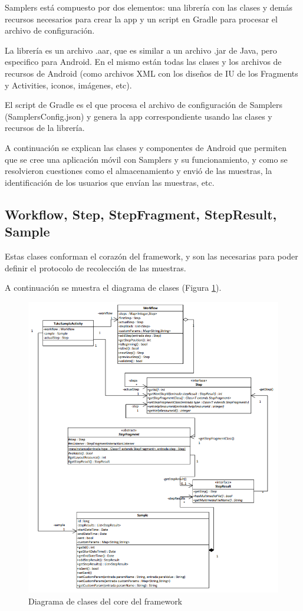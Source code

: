 Samplers está compuesto por dos elementos: una librería con las clases y demás recursos necesarios para crear la app y un script en Gradle para procesar el archivo de configuración.

La librería es un archivo .aar, que es similar a un archivo .jar de Java, pero especifico para Android. En el mismo están todas las clases y los archivos de recursos de Android (como archivos XML con los diseños de IU de los Fragments y Activities, iconos, imágenes, etc).

El script de Gradle es el que procesa el archivo de configuración de Samplers (SamplersConfig.json) y genera la app correspondiente usando las clases y recursos de la librería.

A continuación se explican las clases y componentes de Android que permiten que se cree una aplicación móvil con Samplers y su funcionamiento, y como se resolvieron cuestiones como el almacenamiento y envió de las muestras, la identificación de los usuarios que envían las muestras, etc.

\subsection{Workflow, Step, StepFragment, StepResult, Sample} \label{sec:clases_core}
Estas clases conforman el corazón del framework, y son las necesarias para poder definir el protocolo de recolección de las muestras.

A continuación se muestra el diagrama de clases (Figura \ref{fig:umlFrameworkCore}).

\begin{figure}[H]
  \centering
    \includegraphics[scale=0.8]{05-implementacion/FrameworkCore.png} 
   \caption{Diagrama de clases del core del framework}
   \label{fig:umlFrameworkCore}
\end{figure}


